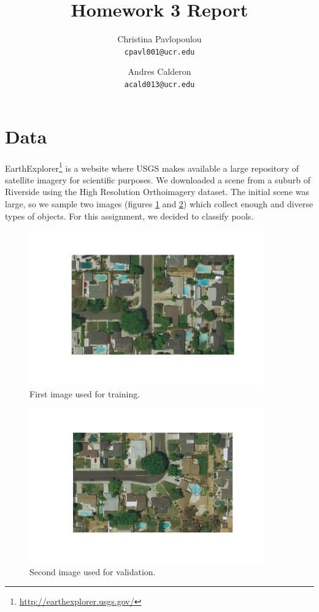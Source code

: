 \documentclass{article}
\title{Homework 3 Report}
\author{
   Christina Pavlopoulou\\
  \small \texttt{cpavl001@ucr.edu}
  \and
   Andres Calderon\\
  \small \texttt{acald013@ucr.edu}
}
\begin{document}
\maketitle

\section{Data}
EarthExplorer\footnote{\url{http://earthexplorer.usgs.gov/}} is a website where USGS makes available a large repository of satellite imagery for scientific purposes.  We downloaded a scene from a suburb of Riverside using the High Resolution Orthoimagery dataset.  The initial scene was large, so we sample two images (figures \ref{fig:image1} and \ref{fig:image2}) which collect enough and diverse types of objects.  For this assignment, we decided to classify pools.

\begin{figure}
 \centering
 \includegraphics[trim=10 60 10 50 , clip, width=0.9\textwidth]{../figures/image1.pdf}
 \caption{First image used for training.}
 \label{fig:image1}
\end{figure}

\begin{figure}
 \centering
 \includegraphics[trim=10 60 10 50 , clip, width=0.9\textwidth]{../figures/image2.pdf}
 \caption{Second image used for validation.}
 \label{fig:image2}
\end{figure}
\end{document}
